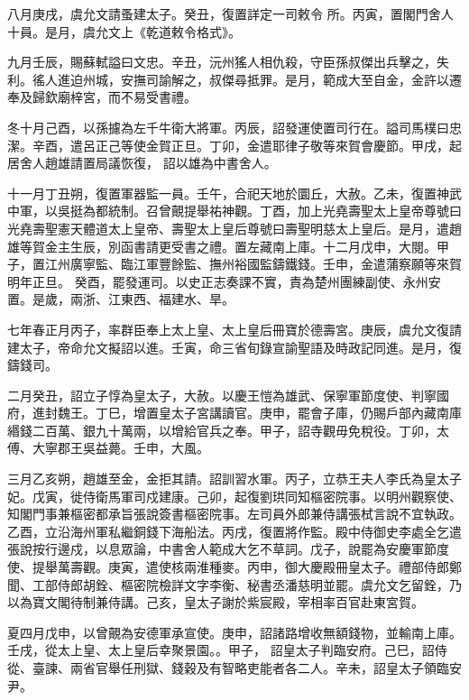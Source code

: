 \begin{pinyinscope}
 八月庚戌，虞允文請蚤建太子。癸丑，復置詳定一司敕令
 所。丙寅，置閣門舍人十員。是月，虞允文上《乾道敕令格式》。



 九月壬辰，賜蘇軾謚曰文忠。辛丑，沅州猺人相仇殺，守臣孫叔傑出兵擊之，失利。徭人進迫州城，安撫司諭解之，叔傑尋抵罪。是月，範成大至自金，金許以遷奉及歸欽廟梓宮，而不易受書禮。



 冬十月己酉，以孫攄為左千牛衛大將軍。丙辰，詔發運使置司行在。謚司馬樸曰忠潔。辛酉，遣呂正己等使金賀正旦。丁卯，金遣耶律子敬等來賀會慶節。甲戌，起居舍人趙雄請置局議恢復，
 詔以雄為中書舍人。



 十一月丁丑朔，復置軍器監一員。壬午，合祀天地於圜丘，大赦。乙未，復置神武中軍，以吳挺為都統制。召曾覿提舉祐神觀。丁酉，加上光堯壽聖太上皇帝尊號曰光堯壽聖憲天體道太上皇帝、壽聖太上皇后尊號曰壽聖明慈太上皇后。是月，遣趙雄等賀金主生辰，別函書請更受書之禮。置左藏南上庫。十二月戊申，大閱。甲子，置江州廣寧監、臨江軍豐餘監、撫州裕國監鑄鐵錢。壬申，金遣蒲察願等來賀明年正旦。
 癸酉，罷發運司。以史正志奏課不實，責為楚州團練副使、永州安置。是歲，兩浙、江東西、福建水、旱。



 七年春正月丙子，率群臣奉上太上皇、太上皇后冊寶於德壽宮。庚辰，虞允文復請建太子，帝命允文擬詔以進。壬寅，命三省旬錄宣諭聖語及時政記同進。是月，復鑄錢司。



 二月癸丑，詔立子惇為皇太子，大赦。以慶王愷為雄武、保寧軍節度使、判寧國府，進封魏王。丁巳，增置皇太子宮講讀官。庚申，罷會子庫，仍賜戶部內藏南庫
 緡錢二百萬、銀九十萬兩，以增給官兵之奉。甲子，詔寺觀毋免稅役。丁卯，太傅、大寧郡王吳益薨。壬申，大風。



 三月乙亥朔，趙雄至金，金拒其請。詔訓習水軍。丙子，立恭王夫人李氏為皇太子妃。戊寅，徙侍衛馬軍司戍建康。己卯，起復劉珙同知樞密院事。以明州觀察使、知閣門事兼樞密都承旨張說簽書樞密院事。左司員外郎兼侍講張栻言說不宜執政。乙酉，立沿海州軍私繼銅錢下海船法。丙戌，復置將作監。殿中侍御史李處全乞遣
 張說按行邊戍，以息眾論，中書舍人範成大乞不草詞。戊子，說罷為安慶軍節度使、提舉萬壽觀。庚寅，遣使核兩淮種麥。丙申，御大慶殿冊皇太子。禮部侍郎鄭聞、工部侍郎胡銓、樞密院檢詳文字李衡、秘書丞潘慈明並罷。虞允文乞留銓，乃以為寶文閣待制兼侍講。己亥，皇太子謝於紫宸殿，宰相率百官赴東宮賀。



 夏四月戊申，以曾覿為安德軍承宣使。庚申，詔諸路增收無額錢物，並輸南上庫。壬戌，從太上皇、太上皇后幸聚景園。。甲子，
 詔皇太子判臨安府。己巳，詔侍從、臺諫、兩省官舉任刑獄、錢穀及有智略吏能者各二人。辛未，詔皇太子領臨安尹。




\end{pinyinscope}
